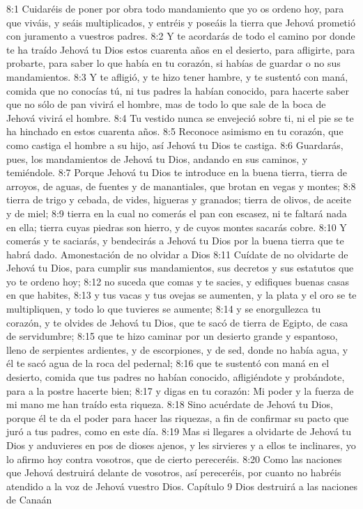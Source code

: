 8:1 Cuidaréis de poner por obra todo mandamiento que yo os ordeno hoy, para que viváis, y seáis multiplicados, y entréis y poseáis la tierra que Jehová prometió con juramento a vuestros padres.  
8:2 Y te acordarás de todo el camino por donde te ha traído Jehová tu Dios estos cuarenta años en el desierto, para afligirte, para probarte, para saber lo que había en tu corazón, si habías de guardar o no sus mandamientos.  
8:3 Y te afligió, y te hizo tener hambre, y te sustentó con maná, comida que no conocías tú, ni tus padres la habían conocido, para hacerte saber que no sólo de pan vivirá el hombre, mas de todo lo que sale de la boca de Jehová vivirá el hombre.  
8:4 Tu vestido nunca se envejeció sobre ti, ni el pie se te ha hinchado en estos cuarenta años.  
8:5 Reconoce asimismo en tu corazón, que como castiga el hombre a su hijo, así Jehová tu Dios te castiga.  
8:6 Guardarás, pues, los mandamientos de Jehová tu Dios, andando en sus caminos, y temiéndole.  
8:7 Porque Jehová tu Dios te introduce en la buena tierra, tierra de arroyos, de aguas, de fuentes y de manantiales, que brotan en vegas y montes;  
8:8 tierra de trigo y cebada, de vides, higueras y granados; tierra de olivos, de aceite y de miel;  
8:9 tierra en la cual no comerás el pan con escasez, ni te faltará nada en ella; tierra cuyas piedras son hierro, y de cuyos montes sacarás cobre.  
8:10 Y comerás y te saciarás, y bendecirás a Jehová tu Dios por la buena tierra que te habrá dado.  
Amonestación de no olvidar a Dios  
8:11 Cuídate de no olvidarte de Jehová tu Dios, para cumplir sus mandamientos, sus decretos y sus estatutos que yo te ordeno hoy;  
8:12 no suceda que comas y te sacies, y edifiques buenas casas en que habites,  
8:13 y tus vacas y tus ovejas se aumenten, y la plata y el oro se te multipliquen, y todo lo que tuvieres se aumente;  
8:14 y se enorgullezca tu corazón, y te olvides de Jehová tu Dios, que te sacó de tierra de Egipto, de casa de servidumbre;  
8:15 que te hizo caminar por un desierto grande y espantoso, lleno de serpientes ardientes, y de escorpiones, y de sed, donde no había agua, y él te sacó agua de la roca del pedernal;  
8:16 que te sustentó con maná en el desierto, comida que tus padres no habían conocido, afligiéndote y probándote, para a la postre hacerte bien;  
8:17 y digas en tu corazón: Mi poder y la fuerza de mi mano me han traído esta riqueza.  
8:18 Sino acuérdate de Jehová tu Dios, porque él te da el poder para hacer las riquezas, a fin de confirmar su pacto que juró a tus padres, como en este día.  
8:19 Mas si llegares a olvidarte de Jehová tu Dios y anduvieres en pos de dioses ajenos, y les sirvieres y a ellos te inclinares, yo lo afirmo hoy contra vosotros, que de cierto pereceréis.  
8:20 Como las naciones que Jehová destruirá delante de vosotros, así pereceréis, por cuanto no habréis atendido a la voz de Jehová vuestro Dios.  
Capítulo 9
Dios destruirá a las naciones de Canaán  

